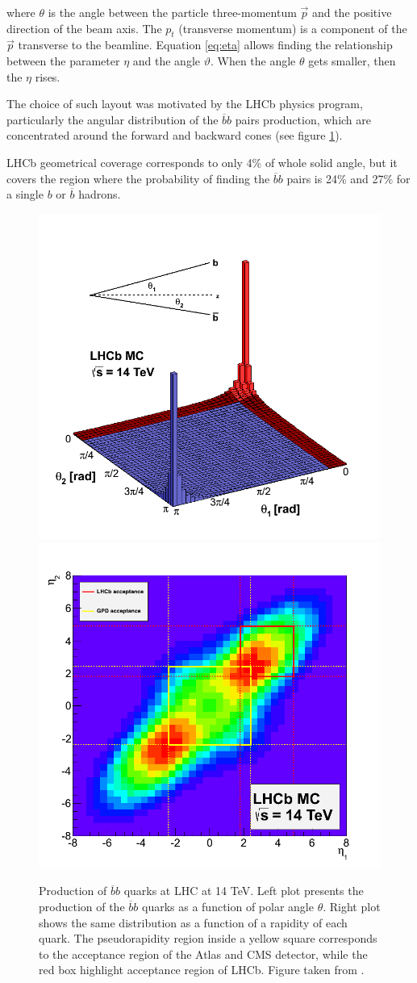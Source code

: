 where $\theta$  is the angle between the particle three-momentum $\vec{p}$ and the positive direction of the beam axis. The $p_t$ (transverse momentum) is a component of the $\vec{p}$ transverse to the beamline.
Equation \ref{eq:eta} allows finding the relationship between the parameter $\eta$ and the angle $\vartheta$. When the angle $\theta$ gets smaller, then the $\eta$ rises.


The choice of such layout was motivated by the LHCb physics program, particularly the angular distribution of the $\overline{b}b$ pairs production, which are concentrated around the forward and backward cones (see figure \ref{fig:bb}).

LHCb geometrical coverage corresponds to only 4\% of whole solid angle, but it covers the region where the probability of finding the  $\overline{b}b$ pairs is 24\% and 27\% for a single $b$ or $\overline{b}$ hadrons. 


\begin{figure}[h]
 \begin{center}
  \includegraphics[width=0.48\linewidth]{figures/bb_2.png}
   \includegraphics[width=0.48\linewidth]{figures/bb_1.png}
   \caption{Production of  $\overline{b}b$ quarks at LHC at 14 TeV. Left plot presents the production of the $\overline{b}b$ quarks as a function of polar angle $\theta$. Right plot shows the same distribution as a function of a rapidity of each quark. The pseudorapidity region inside a yellow square corresponds to the acceptance region of the Atlas and CMS detector, while the red box highlight acceptance region of LHCb. Figure taken from \cite{bbangles}. 
     \label{fig:bb}}
 \end{center}
\end{figure}

